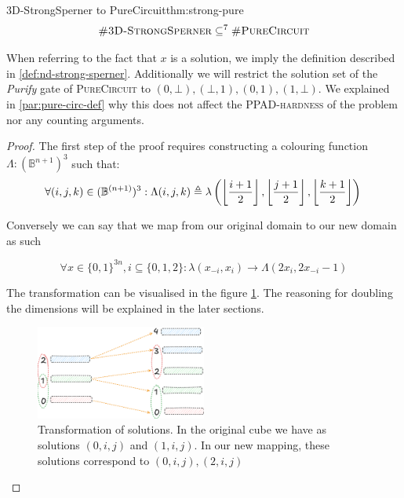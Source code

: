 \begin{theorembox}{3D-StrongSperner to PureCircuit}{thm:strong-pure}
    $$
    \textnormal{\textsc{\#3D-StrongSperner}} \subseteq^{7} \textnormal{\textsc{\#PureCircuit}}
    $$
\end{theorembox}

When referring to the fact that $x$ is a solution, we imply the definition described in  \ref{def:nd-strong-sperner}.
Additionally we will restrict the solution set of the \textit{Purify} gate of \textsc{PureCircuit}
to $(0,\bot),(\bot, 1), (0,1), (1, \bot)$.  We explained in \ref{par:pure-circ-def} why this
does not affect the \textsc{PPAD-hardness} of the problem nor any counting arguments.

\begin{proof} 
    The first step of the proof requires constructing a colouring function $\Lambda: (\mathbb{B}^{n+1})^3$ such that:
$$
\forall (i,j,k) \in (\mathbb{B}^{(n+1)})^3: \Lambda(i,j,k) \triangleq 
\lambda\left( \left\lfloor  \frac{{i+1}}{2}  \right\rfloor, \left\lfloor  \frac{{j+1}}{2} \right\rfloor, \left\lfloor  \frac{{k+1}}{2} \right\rfloor \right)  \\
$$

Conversely we can say that we map from our original domain to our new domain as such

\begin{equation}
    \label{eq:trans-eq}
\forall  x \in \{ 0,1 \}^{3n}, i \subseteq \{ 0,1,2 \}: \lambda(x_{-i}, x_{i}) \to \Lambda(2x_{i}, 2x_{-i} -1)
\end{equation}

The transformation can be visualised in the figure \ref{fig:main-proof:set_mapping}.
The reasoning for doubling the dimensions will be explained in the later sections.

\begin{figure}[h!]
    \centering
    \includegraphics[width=0.5\textwidth]{assets/1751381227.png}
\caption{Transformation of solutions. In the original cube we have as solutions $(0, i,j)$ and $(1, i,j)$. In our new mapping, these solutions correspond to
$(0, i,j), (2,i,j)$}
    \label{fig:main-proof:set_mapping}
\end{figure}


\end{proof}
